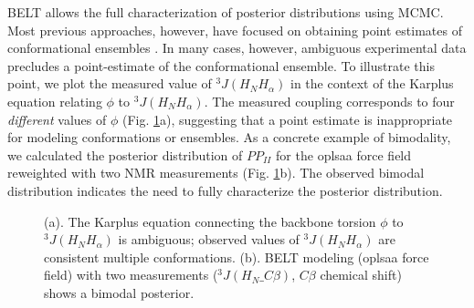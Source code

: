 \documentclass[journal=jacsat,manuscript=article]{achemso}
\begin{document}
BELT allows the full characterization of posterior distributions using MCMC.  Most previous approaches, however, have focused on obtaining point estimates of conformational ensembles \cite{rozycki2011saxs,  Graf2007}.  In many cases, however, ambiguous experimental data precludes a point-estimate of the conformational ensemble.  To illustrate this point, we plot the measured \cite{Graf2007} value of $^3J(H_NH_\alpha)$ in the context of the Karplus equation relating $\phi$ to $^3J(H_NH_\alpha)$.  The measured coupling corresponds to four \emph{different} values of $\phi$ (Fig. \ref{figure:Ambiguity}a), suggesting that a point estimate is inappropriate for modeling conformations or ensembles.  As a concrete example of bimodality, we calculated the posterior distribution of $PP_{II}$ for the oplsaa force field reweighted with two NMR measurements (Fig. \ref{figure:Ambiguity}b).  The observed bimodal distribution indicates the need to fully characterize the posterior 
distribution.  

\begin{figure}
\caption{
(a).  The Karplus equation connecting the backbone torsion $\phi$ to $^3J(H_NH_\alpha)$ is ambiguous; observed values of $^3J(H_NH_\alpha)$ are consistent multiple conformations.  (b).  BELT modeling (oplsaa force field) with two measurements ($^3J(H_N\_C\beta)$, $C\beta$ chemical shift) shows a bimodal posterior.  
}
\label{figure:Ambiguity}

\end{figure}
\end{document}
